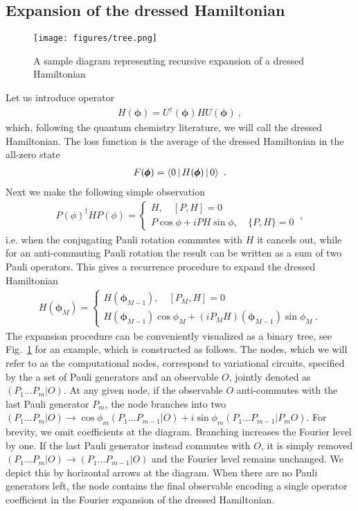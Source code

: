 \documentclass[twocolumn, amsfonts, amssymb, aps, nofootinbib]{revtex4-2}
\begin{document}
\subsection{Expansion of the dressed Hamiltonian}
\begin{figure}
	\texttt{[image: figures/tree.png]}
	\caption{A sample diagram representing recursive expansion of a dressed Hamiltonian}
	\label{fig tree}
\end{figure}


Let us introduce operator
\begin{align}
	H(\pmb\phi)=U^\dagger(\pmb\phi)HU(\pmb\phi)\ ,
\end{align}
which, following the quantum chemistry literature, we will call the dressed Hamiltonian. The loss function is the average of the dressed Hamiltonian in the all-zero state
\begin{align}
	 F(\pmb\phi)=\Braket{0|H(\pmb\phi)|0} \ . \label{F from H dressed}
\end{align}
Next we make the following simple observation
\begin{align}
	P(\phi)^\dagger HP(\phi)=\begin{cases} H,\quad [P, H]=0\\ P\cos\phi+iPH\sin\phi,\quad \{P,H\}=0\end{cases} \ ,
\end{align}
i.e. when the conjugating Pauli rotation commutes with $H$ it cancels out, while for an anti-commuting Pauli rotation the result can be written as a sum of two Pauli operators. This gives a recurrence procedure to expand the dressed Hamiltonian
\begin{align}
H(\pmb\phi_M)=\begin{cases} H(\pmb\phi_{M-1}),\quad [P_M, H]=0\\ H(\pmb\phi_{M-1})\cos\phi_M+(iP_MH)(\pmb\phi_{M-1})\sin\phi_M \ .\end{cases} \label{H cases}
\end{align}
The expansion procedure can be conveniently visualized as a binary tree, see Fig.~\ref{fig tree} for an example, which is constructed as follows. The nodes, which we will refer to as the computational nodes, correspond to variational circuits, specified by the a set of Pauli generators and an observable $O$, jointly denoted as $(P_1\dots P_m|O)$. At any given node, if the observable $O$ anti-commutes with the last Pauli generator $P_m$, the node branches into two $(P_1\dots P_m|O)\to\cos\phi_m (P_1\dots P_{m-1}|O)+i\sin\phi_m (P_1\dots P_{m-1}|P_m O)$. For brevity, we omit coefficients at the diagram. Branching increases the Fourier level by one. If the last Pauli generator instead commutes with $O$, it is simply removed $(P_1\dots P_m|O)\to (P_1\dots P_{m-1}|O)$ and the Fourier level remains unchanged. We depict this by horizontal arrows at the diagram. When there are no Pauli generators left, the node contains the final observable encoding a single operator coefficient in the Fourier expansion of the dressed Hamiltonian.
\end{document}
